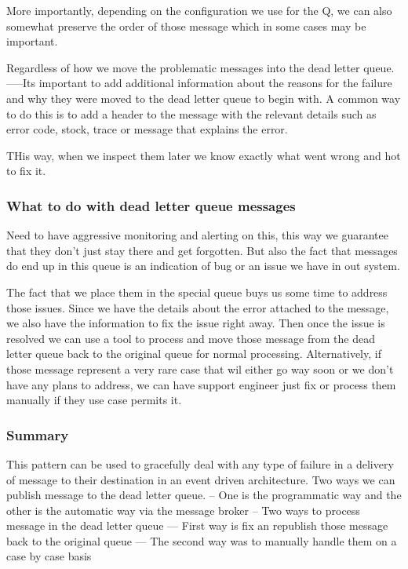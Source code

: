 More importantly, depending on the configuration we use for the Q, we can also somewhat preserve the order of those message which in some cases may be important.

Regardless of how we move the problematic messages into the dead letter queue.
-----Its important to add additional information about the reasons for the failure and why they were moved to the dead letter queue to begin with.
A common way to do this is to add a header to the message with the relevant details such as error code, stock, trace or message that explains the error.

THis way, when we inspect them later we know exactly what went wrong and hot to fix it.

\subsubsection{What to do with dead letter queue messages}
Need to have aggressive monitoring and alerting on this, this way we guarantee that they don't just stay there and get forgotten.
But also the fact that messages do end up in this queue is an indication of bug or an issue we have in out system.

The fact that we place them in the special queue buys us some time to address those issues.
Since we have the details about the error attached to the message, we also have the information to fix the issue right away.
Then once the issue is resolved we can use a tool to process and move those message from the dead letter queue back to the original queue for normal processing.
Alternatively, if those message represent a very rare case that wil either go way soon or we don't have any plans to address, we can have support engineer just fix or process them manually if they use case permits it.

\subsubsection{Summary}
This pattern can be used to gracefully deal with any type of failure in a delivery of message to their destination in an event driven architecture.
Two ways we can publish message to the dead letter queue.
-- One is the programmatic way and the other is the automatic way via the message broker
-- Two ways to process message in the dead letter queue
--- First way is fix an republish those message back to the original queue
--- The second way was to manually handle them on a case by case basis


